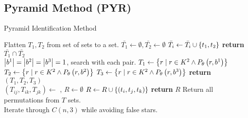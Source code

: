 \documentclass[conference]{IEEEtran}
\begin{document}
    \subsection{Pyramid Method (PYR)}\label{subsec:pyramidMethod}
    \begin{algorithm}
        \caption{Pyramid Identification Method} \label{algorithm:pyramidIdentification}
        \begin{algorithmic}[1]
            \LineComment Flatten $T_1, T_2$ from set of sets to a set.
            \State $\bar{T_1} \gets \emptyset, \bar{T_2} \gets \emptyset$
            \State $\bar{T_i} \gets \bar{T_i} \cup \left\{  t_1, t_2  \right\}$
            \EndFor
            \EndFor
            \State \textbf{return} $\bar{T_1} \cap \bar{T_2}$
            \EndFunction
            \\
            \LineComment $\left| b^1 \right| = \left| b^2 \right| = \left| b^3 \right| = 1$, search with each pair.
            \State $T_1 \gets \left\{  r \mid r \in K^2 \land P_\theta \left(r, b^1\right)  \right\}$
            \State $T_2 \gets \left\{  r \mid r \in K^2 \land P_\theta \left(r, b^2\right)  \right\}$
            \State $T_3 \gets \left\{  r \mid r \in K^2 \land P_\theta \left(r, b^3\right)  \right\}$
            \State \textbf{return}{$\left( T_1, T_2, T_3 \right)$}
            \EndFunction
            \\
            \State $(T_{ij}, T_{ik}, T_{jk}) \gets$ , $R \gets \emptyset$
            \State $R \gets R \cup \left\{  \left(t_i, t_j, t_k\right)  \right\}$
            \EndFor
            \EndFor
            \EndFor
            \State \textbf{return} $R$ \Comment Return all permutations from $T$ sets.
            \EndFunction
            \\
            \LineComment Iterate through $C(n, 3)$ while avoiding false stars.
            \For{$dj \gets 1 \text{\textbf{ to }} n - 2$}

\end{algorithmic}
\end{algorithm}
\end{document}
